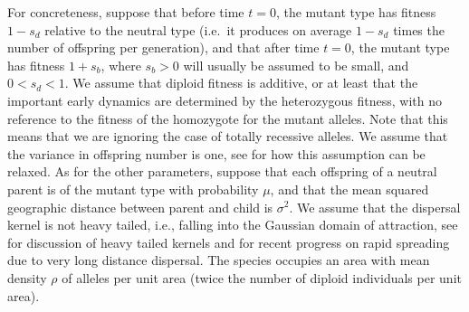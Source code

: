 \documentclass{article}
\begin{document}
For concreteness, suppose that before time $t=0$,
the mutant type has fitness $1-s_d$ relative to the neutral type
(i.e.\ it produces on average $1-s_d$ times the number of offspring per generation),
and that after time $t=0$,
the mutant type has fitness $1+s_b$,
where $s_b>0$ will usually be assumed to be small, and $0<s_d<1$.
We assume that diploid fitness is additive, or at least that the
important early dynamics are determined by the heterozygous fitness, with no reference to the fitness of the
homozygote for the mutant alleles. Note that this means that we
  are ignoring the case of totally recessive alleles.
We assume that the variance in offspring number is one, see
  \cite{ralphcoop2010} for how this assumption can be relaxed.
As for the other parameters,
suppose that each offspring of a neutral parent is of the mutant type with probability $\mu$,
and that the mean squared geographic distance between parent and child
is $\sigma^2$. We assume that the dispersal kernel is
  not heavy tailed, i.e., falling into the Gaussian domain of attraction, see \citet{ralphcoop2010} for
  discussion of heavy tailed kernels and \citet{hallatschek_acceleration_2014} for recent progress
  on rapid spreading due to very long distance dispersal.
The species occupies an area with mean density
$\rho$ of alleles per unit area (twice the number of diploid
  individuals per unit area).


\end{document}
